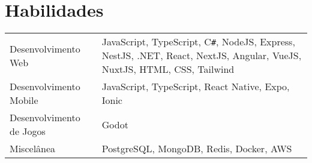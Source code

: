 \documentclass[a4paper,12pt]{article}
\begin{document}
\section{Habilidades}
\begin{tabularx}{\linewidth}{@{}l X@{}}
Desenvolvimento Web & \normalsize{JavaScript, TypeScript, C{\texttt{\#}}, NodeJS, Express, NestJS, .NET, React, NextJS, Angular, VueJS, NuxtJS, HTML, CSS, Tailwind}\\
Desenvolvimento Mobile & \normalsize{JavaScript, TypeScript, React Native, Expo, Ionic}\\
Desenvolvimento de Jogos & \normalsize{Godot}\\
Miscelânea  &  \normalsize{PostgreSQL, MongoDB, Redis, Docker, AWS}\\  
\end{tabularx}

\vfill
{}
\end{document}
